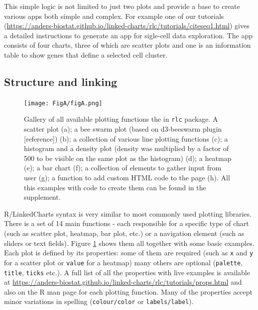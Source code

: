 \documentclass[twocolumn,10pt]{article}
\begin{document}
This simple logic is not limited to just two plots and provide a base to create various apps both simple and complex. For example one of our tutorials (\url{https://anders-biostat.github.io/linked-charts/rlc/tutorials/citeseq1.html}) gives a detailed instructions to generate an app for sigle-cell data exploration. The app consists of four charts, three of which are scatter plots and one is an information table to show genes that define a selected cell cluster.

\subsection{Structure and linking}
\begin{figure}
	\texttt{[image: FigA/figA.png]}
	\caption{Gallery of all available plotting functions the in \texttt{rlc} package. A scatter plot (a); a bee swarm plot (based on d3-beeswarm plugin [reference]) (b); a collection of various line plotting functions (c); a histogram and a density plot (density was multiplied by a factor of 500 to be visible on the same plot as the histogram) (d); a heatmap (e); a bar chart (f); a collection of elements to gather input from user (g); a function to add custom HTML code to the page (h). All this examples with code to create them can be found in the supplement.}
	\label{FigA}
\end{figure}

R/LinkedCharts syntax is very similar to most commonly used plotting libraries. There is a set of 14 main functions - each responsible for a specific type of chart (such as scatter plot, heatmap, bar plot, etc.) or a navigation element (such as sliders or text fields). Figure \ref{FigA} shows them all together with some basic examples. Each plot is defined by its properties: some of them are required (such as \texttt{x} and \texttt{y} for a scatter plot or \texttt{value} for a heatmap) many others are optional (\texttt{palette}, \texttt{title}, \texttt{ticks} etc.). A full list of all the properties with live examples is available at \url{https://anders-biostat.github.io/linked-charts/rlc/tutorials/props.html} and also on the R man page for each plotting function. Many of the properties accept minor variations in spelling (\texttt{colour/color} or \texttt{labels/label}).
\end{document}
